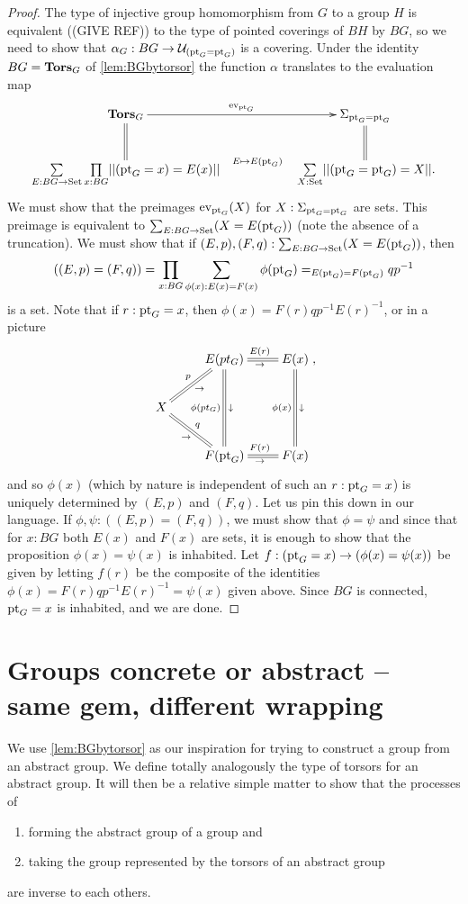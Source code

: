 \begin{proof}
  The type of injective group homomorphism from $G$ to a group $H$ is equivalent ((GIVE REF)) to the type of pointed coverings of $BH$ by $BG$, so we need to show that $\alpha_G:BG\to\mathcal{U}_{({\mathord{\mathrm{pt}}}_G={\mathord{\mathrm{pt}}}_G)}$ is a covering.  
Under the identity $BG=\mathbf{Tors}_G$ of \cref{lem:BGbytorsor} the function $\alpha$ translates to the evaluation map
$$\xymatrix{
  \typetorsor_G\ar[rr]^-{\mathrm{ev}_{\pt_G}}\ar@{=}[d]&&\Sigma_{\pt_G=\pt_G}\ar@{=}[d]\\
  \underset{E:BG\to\Set}\sum\,\underset{x:BG}\prod||(\pt_G=x)=E(x)||\ar@{}[rr]^-{E\mapsto E(\pt_G)}&&
\,\underset{X:\Set}\sum||(\pt_G=\pt_G)=X||.
}$$
We must show that the preimages $\mathrm{ev}_{{\mathord{\mathrm{pt}}}_G}(X)$ for $X:\Sigma_{{\mathord{\mathrm{pt}}}_G={\mathord{\mathrm{pt}}}_G}$ are sets.  
This preimage is equivalent to $\sum_{E:BG\to\mathord{\mathrm{Set}}}(X=E({\mathord{\mathrm{pt}}}_G))$ (note the absence of a truncation).  We must show that if $(E,p),(F,q):\sum_{E:BG\to\mathord{\mathrm{Set}}}(X=E({\mathord{\mathrm{pt}}}_G))$, then 
$$((E,p)=(F,q))=\prod_{x:BG}\sum_{\phi(x):E(x)=F(x)}\phi({\mathord{\mathrm{pt}}}_G)=_{E({\mathord{\mathrm{pt}}}_G)=F({\mathord{\mathrm{pt}}}_G)}qp^{-1}$$ is a set.  
Note that if $r:{\mathord{\mathrm{pt}}}_G=x$, then $\phi(x)=F(r)qp^{-1}E(r)^{-1}$, or in a picture
$$\xymatrix{&E(pt_G)\ar@{=}[r]^{E(r)}_\to\ar@{=}[dd]_{\phi(pt_G)}^\downarrow&E(x)\ar@{=}[dd]_{\phi(x)}^\downarrow\\
  X\ar@{=}[ur]^p_\to\ar@{=}[dr]^q_\to&&\\
  &F(\pt_G)\ar@{=}[r]^{F(r)}_\to&F(x)},$$
and so $\phi(x)$ (which by nature is independent of such an $r:{\mathord{\mathrm{pt}}}_G=x$) is uniquely determined by $(E,p)$ and $(F,q)$.  Let us pin this down in our language.
If $\phi,\psi:((E,p)=(F,q))$, we must show that $\phi=\psi$ and since that for $x:BG$ both $E(x)$ and $F(x)$ are sets, it is enough to show that the proposition $\phi(x)=\psi(x)$ is inhabited.  Let $f:({\mathord{\mathrm{pt}}}_G=x)\to(\phi(x)=\psi(x))$ be given by letting $f(r)$ be the composite of the identities $\phi(x)=F(r)qp^{-1}E(r)^{-1}=\psi(x)$ given above.  Since $BG$ is connected, ${\mathord{\mathrm{pt}}}_G=x$ is inhabited, and we are done.
\end{proof}



\section{Groups concrete or abstract -- same gem, different wrapping}
\label{sec:Gsetforabstract}

We use \cref{lem:BGbytorsor} as our inspiration for trying to construct a group from an abstract group.  We define totally analogously the type of torsors for an abstract group.  It will then be a relative simple matter to show that the processes of
\begin{enumerate}
\item forming the abstract group of a group and 
\item taking the group represented by the torsors of an abstract group
\end{enumerate}
 are inverse to each others.

